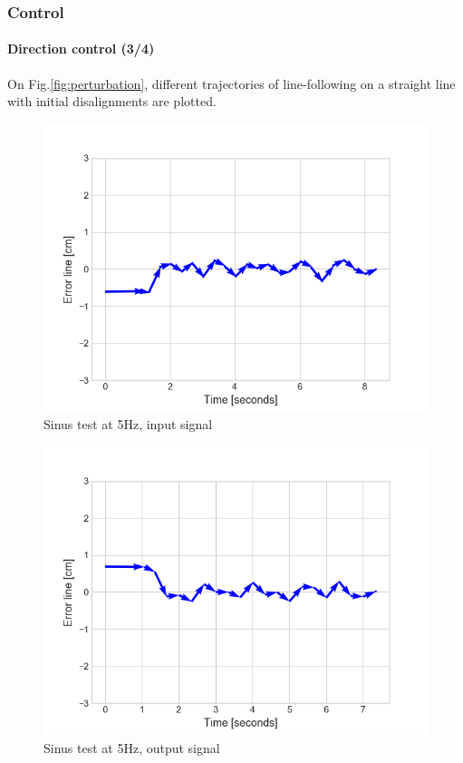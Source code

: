 \documentclass[10pt]{beamer}
\begin{document}
\begin{frame}
\frametitle{Control}
\framesubtitle{Direction control (3/4)}
On Fig.\ref{fig:perturbation}, different trajectories of line-following on a straight line with initial disalignments are plotted.
\begin{multicols}{2}
\begin{figure}
\centering
\includegraphics[scale=0.4]{figures/small-perturbation-left.png}
\caption{Sinus test at 5Hz, input signal}
\end{figure}
\columnbreak
\begin{figure}
\centering
\includegraphics[scale=0.4]{figures/small-perturbation-right.png}
\caption{Sinus test at 5Hz, output signal}
\end{figure}
\end{multicols}
\end{frame}
\end{document}
